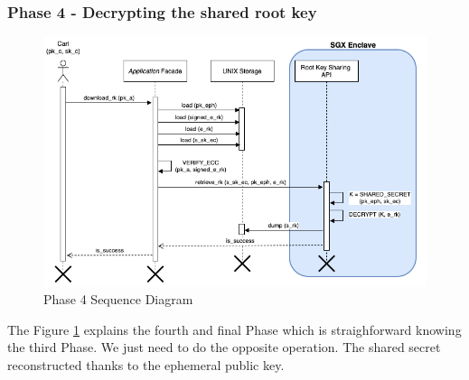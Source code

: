 \documentclass[../main.tex]{subfiles}
\begin{document}
\subsubsection{Phase 4 - Decrypting the shared root key}
\begin{figure}[h]
    \centering
    \includegraphics[width=\textwidth]{../../images/lauxus/download_rk}
    
    \caption{Phase 4 Sequence Diagram}
    \label{figure:lauxus:download_rk}
\end{figure}
\par The Figure \ref{figure:lauxus:download_rk} explains the fourth and final Phase which is straighforward knowing the third Phase. We just need to do the opposite operation. The shared secret reconstructed thanks to the ephemeral public key.



\end{document}
